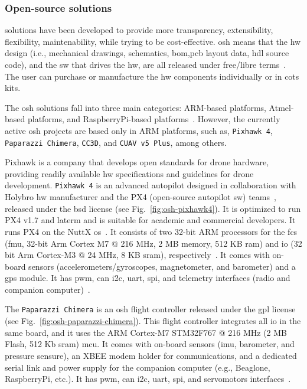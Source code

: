 \subsubsection{Open-source solutions}%
\label{sec:open-source-solut-hw}
 solutions have been developed to provide more transparency,
extensibility, flexibility, maintenability, while trying to be
cost-effective. \gls{osh} means that the \gls{hw} design (i.e., mechanical
drawings, schematics, \gls{bom},\gls{pcb} layout data, \gls{hdl} source code),
and the \gls{sw} that drives the \gls{hw}, are all released under free/libre
terms~\cite{freeGNU}.
The user can purchase or manufacture the \gls{hw} components
individually or in \gls{cots} kits.

The \gls{osh} solutions fall into three main categories: ARM-based platforms,
Atmel-based platforms, and RaspberryPi-based
platforms~\cite{ebeidUAVPlatformsSurvey2017}. However, the currently active
\gls{osh} projects are based only in ARM platforms, such as, \texttt{Pixhawk 4},
\texttt{Paparazzi Chimera}, \texttt{CC3D}, and \texttt{CUAV v5 Plus}, among
others.

  Pixhawk is a company that develops open standards for drone
  hardware, providing readily available \gls{hw} specifications and guidelines
  for drone development. \texttt{Pixhawk 4} is an advanced autopilot designed in
  collaboration with Holybro {\gls{hw} manufacturer} and the PX4 (open-source
  autopilot \gls{sw}) teams~\cite{pixhawk4}, released under the \gls{bsd} license (see Fig.~\ref{fig:osh-pixhawk4}). It is optimized to run PX4 v1.7 and
  laterm and is suitable for academic and commercial developers. It runs PX4 on
  the NuttX \gls{os}~\cite{pixhawk4}. It consists of two 32-bit ARM processors
  for the \gls{fcs} (\gls{fmu}, 32-bit Arm Cortex M7 @ 216 MHz, 2 MB memory, 512
  KB \gls{ram}) and \gls{io} (32 bit Arm Cortex-M3 @ 24 MHz, 8 KB \gls{sram}),
  respectively~\cite{pixhawk4}. It comes with on-board sensors
  (accelerometers/gyroscopes, magnetometer, and barometer) and a \gls{gps}
  module. It has \gls{pwm}, \gls{can} \gls{i2c}, \gls{uart}, \gls{spi}, and
  telemetry interfaces (radio and companion computer)~\cite{pixhawk4}.

  The \texttt{Paparazzi Chimera} is an \gls{osh} flight controller released
  under the \gls{gpl} license~\cite{paparazziChimera} (see Fig.~\ref{fig:osh-paparazzi-chimera}).
  This flight controller integrates all \gls{io} in the same board, and it uses the ARM Cortex-M7 STM32F767 @ 216 MHz (2 MB Flash,
  512 Kb \gls{sram}) \gls{mcu}. It comes with on-board sensors
  (\gls{imu}, barometer, and pressure sensure), an XBEE modem holder for
  communications, and a dedicated serial link and power supply for the companion
  computer (e.g., Beaglone, RaspberryPi, etc.). It has \gls{pwm}, \gls{can}
  \gls{i2c}, \gls{uart}, \gls{spi}, and servomotors interfaces~\cite{pixhawk4}.
  

